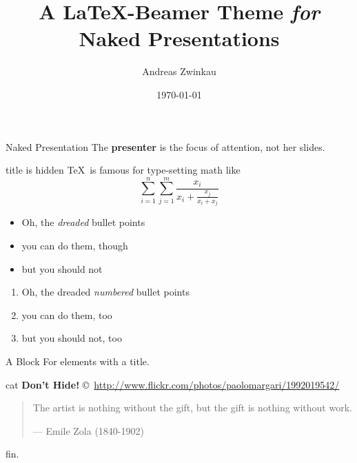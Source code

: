 \documentclass[english,german]{beamer}
\title{A \LaTeX-Beamer Theme {\itshape for} Naked Presentations}
\date{\today}
\author{Andreas Zwinkau}
\begin{document}
\titlepage

\begin{defnframe}{Naked Presentation}
The \textbf{presenter} is the focus of attention,
not her slides.
\end{defnframe}

\begin{frame}{title is hidden}
\TeX\ is famous for type-setting math like \[
   \sum_{i=1}^{n}\sum_{j=1}^{m} 
   \frac{x_i}{x_i + \frac{x_j}{x_i+x_j}}
\]
\end{frame}

\begin{frame}
\begin{itemize}
   \item Oh, the {\itshape dreaded} bullet points
   \item you can do them, though
   \item but you should not
\end{itemize}
\end{frame}

\begin{frame}
\begin{enumerate}
   \item Oh, the dreaded \emph{numbered} bullet points
   \item you can do them, too
   \item but you should not, too
\end{enumerate}
\end{frame}

\begin{frame}
\begin{block}{A Block}
   For elements with a title.
\end{block}
\end{frame}

\begin{imageframe}{cat}
   \color{black}
   {\bf\Large Don't Hide!}
   \vskip6.5cm
   \hfill {\tiny\copyright~\url{http://www.flickr.com/photos/paolomargari/1992019542/}}
\end{imageframe}

\begin{frame}
\begin{quote}
   The artist is nothing without the gift, but the gift is nothing without work.

   \hfill--- Emile Zola (1840-1902)
\end{quote}
\end{frame}

\emptyslide

\begin{wordframe}
fin.
\end{wordframe}
\end{document}

